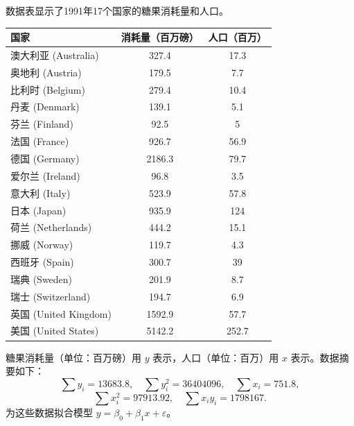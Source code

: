 \begin{questions}

\question
数据表显示了1991年17个国家的糖果消耗量和人口。
\begin{center}
\begin{tabular}{l|c|c}
国家 & 消耗量（百万磅） & 人口（百万） \\ \hline
澳大利亚 (Australia) & 327.4 & 17.3 \\
奥地利 (Austria) & 179.5 & 7.7 \\
比利时 (Belgium) & 279.4 & 10.4 \\
丹麦 (Denmark) & 139.1 & 5.1 \\
芬兰 (Finland) & 92.5 & 5 \\
法国 (France) & 926.7 & 56.9 \\
德国 (Germany) & 2186.3 & 79.7 \\
爱尔兰 (Ireland) & 96.8 & 3.5 \\
意大利 (Italy) & 523.9 & 57.8 \\
日本 (Japan) & 935.9 & 124 \\
荷兰 (Netherlands) & 444.2 & 15.1 \\
挪威 (Norway) & 119.7 & 4.3 \\
西班牙 (Spain) & 300.7 & 39 \\
瑞典 (Sweden) & 201.9 & 8.7 \\
瑞士 (Switzerland) & 194.7 & 6.9 \\
英国 (United Kingdom) & 1592.9 & 57.7 \\
美国 (United States) & 5142.2 & 252.7 \\
\end{tabular}
\end{center}
\question
糖果消耗量（单位：百万磅）用 $y$ 表示，人口（单位：百万）用 $x$ 表示。数据摘要如下：
\[
\sum y_i = 13683.8, \quad \sum y_i^2 = 36404096, \quad \sum x_i = 751.8,
\]
\[
\sum x_i^2 = 97913.92, \quad \sum x_i y_i = 1798167.
\]
为这些数据拟合模型 $y = \beta_0 + \beta_1 x + \varepsilon$。
\begin{parts}

\end{parts}
\end{questions}
